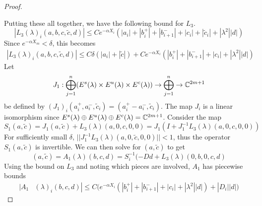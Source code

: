 \documentclass[thesis.tex]{subfiles}
\begin{document}
\begin{lemma}
\begin{proof}
\begin{enumerate}
\end{enumerate}
Putting these all together, we have the following bound for $L_3$.
\begin{equation}\label{L3bound}
|L_3(\lambda)_i(a, b, c, \tilde{c}, d)| \leq C e^{-\alpha X_i} \left( |a_i| + |b_i^+| + |b_{i+1}^-| + |c_i| + |\tilde{c}_i| + |\lambda^2| |d| \right)
\end{equation}
Since $e^{-\alpha X_m} < \delta$, this becomes
\begin{align*}
|L_3(\lambda)_i(a, b, c, \tilde{c}, d)| \leq C \delta ( |a_i| + |\tilde{c}| ) + C e^{-\alpha X_i} \left( |b_i^+| + |b_{i+1}^-| + |c_i| + |\lambda^2| |d| \right)
\end{align*}
Let 
\[
J_1: \bigoplus_{j=1}^n (E^s(\lambda) \times E^u(
\lambda) \times E^c(\lambda) ) \rightarrow \bigoplus_{j=1}^n \rightarrow \mathbb{C}^{2m+1}
\]
be defined by $(J_1)_i(a_i^+, a_i^-, \tilde{c}_i) = (a_i^+ - a_i^-, \tilde{c}_i)$. The map $J_i$ is a linear isomorphism since $E^s(\lambda) \oplus E^u(\lambda) \oplus E^c(\lambda) = \mathbb{C}^{2m+1}$. Consider the map
\[
S_1(a, \tilde{c}) = J_1 (a, \tilde{c}) + L_3(\lambda)(a, 0, c, 0, 0) = J_1( I + J_1^{-1} L_3(\lambda)(a, 0, c, 0, 0))
\]
For sufficiently small $\delta$, $||J_1^{-1} L_3(\lambda)(a, 0, \tilde{c}, 0, 0)|| < 1$, thus the operator $S_1(a, \tilde{c})$ is invertible. We can then solve for $(a, \tilde{c})$ to get
\[
(a, \tilde{c}) = A_1(\lambda)(b, c, d) = S_i^{-1}(-D d + L_3(\lambda)(0, b, 0, c, d)
\]
Using the bound on $L_3$ and noting which pieces are involved, $A_1$ has piecewise bounds
\begin{align*}
|A_1&(\lambda)_i(b, c, d)|
\leq C \Big( e^{-\alpha X_i} (|b_i^+| + |b_{i+1}^-| + |c_i| + |\lambda^2||d|) + |D_i||d| \Big)
\end{align*} 


\end{proof}
\end{lemma}
\end{document}
